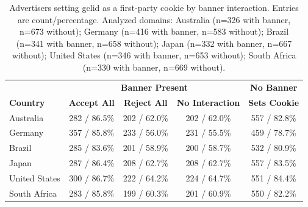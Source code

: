 \begin{table}[t!]
    \centering
    \small
    \begin{tabular}{l|ccc|c}
    \toprule
        & \multicolumn{3}{c|}{\textbf{Banner Present}} & \textbf{No Banner} \\
        \textbf{Country} & \textbf{Accept All} & \textbf{Reject All} & \textbf{No Interaction} & \textbf{Sets Cookie} \\
        \midrule
        Australia & 282 / 86.5\% & 202 / 62.0\% & 202 / 62.0\% & 557 / 82.8\% \\
        Germany & 357 / 85.8\% & 233 / 56.0\% & 231 / 55.5\% & 459 / 78.7\% \\
        Brazil & 285 / 83.6\% & 201 / 58.9\% & 200 / 58.7\% & 532 / 80.9\% \\
        Japan & 287 / 86.4\% & 208 / 62.7\% & 208 / 62.7\% & 557 / 83.5\% \\
        United States & 300 / 86.7\% & 222 / 64.2\% & 224 / 64.7\% & 551 / 84.4\% \\
        South Africa & 283 / 85.8\% & 199 / 60.3\% & 201 / 60.9\% & 550 / 82.2\% \\
        \bottomrule
    \end{tabular}
\caption{Advertisers setting gclid as a first-party cookie by banner interaction.
Entries are count/percentage. Analyzed domains: Australia (n=326 with banner, n=673 without); Germany (n=416 with banner, n=583 without); Brazil (n=341 with banner, n=658 without); Japan (n=332 with banner, n=667 without); United States (n=346 with banner, n=653 without); South Africa (n=330 with banner, n=669 without).}
    \label{tab:gclid_breakdown}
\end{table}
